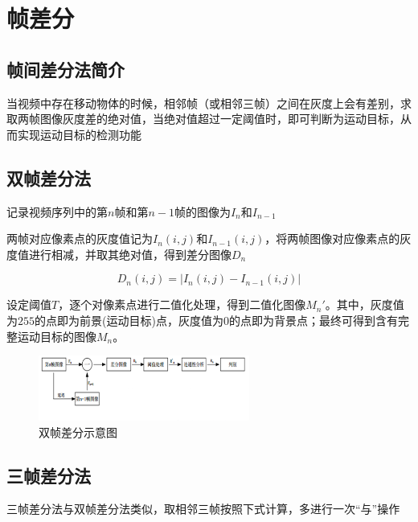 \section{帧差分}

\subsection{帧间差分法简介}


当视频中存在移动物体的时候，相邻帧（或相邻三帧）之间在灰度上会有差别，求取两帧图像灰度差的绝对值，当绝对值超过一定阈值时，即可判断为运动目标，从而实现运动目标的检测功能



\subsection{双帧差分法}

记录视频序列中的第$n$帧和第$n-1$帧的图像为$I_n$和$I_{n-1}$

两帧对应像素点的灰度值记为$I_n(i,j)$和$I_{n-1}(i,j)$，将两帧图像对应像素点的灰度值进行相减，并取其绝对值，得到差分图像$D_n$

\begin{equation}
    D_n (i, j) = \left\lvert I_n (i, j) - I_{n - 1} (i, j) \right\rvert
\end{equation}

设定阈值$T$，逐个对像素点进行二值化处理，得到二值化图像$M_n'$。其中，灰度值为$255$的点即为前景(运动目标)点，灰度值为$0$的点即为背景点；最终可得到含有完整运动目标的图像$M_n$。

\begin{figure}
    \centering
    \includegraphics[width=0.618\textwidth]{images/fd_double.png}
    \caption{双帧差分示意图}
\end{figure}



\subsection{三帧差分法}

三帧差分法与双帧差分法类似，取相邻三帧按照下式计算，多进行一次``与''操作

